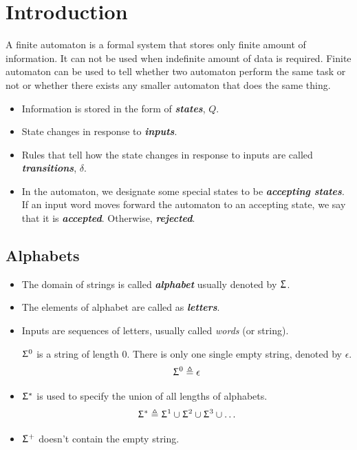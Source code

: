 \documentclass{report}
\begin{document}
\section{Introduction}
A finite automaton is a formal system that stores only finite amount of information. It can not be used when indefinite amount of data is required. Finite automaton can be used to tell whether two automaton perform the same task or not or whether there exists any smaller automaton that does the same thing. 
\begin{itemize}
    \item Information is stored in the form of \textit{\textbf{states}}, $Q$.
    \item State changes in response to \textit{\textbf{inputs}}.
    \item Rules that tell how the state changes in response to inputs are called \textit{\textbf{transitions}}, $\delta$. 
    \item In the automaton, we designate some special states to be \textit{\textbf{accepting states}}. If an input word moves forward the automaton to an accepting state, we say that it is \textit{\textbf{accepted}}. Otherwise, \textbf{\textit{rejected}}.
    \end{itemize}

    \subsection{Alphabets}
    \begin{itemize}
        \item The domain of strings is called \textit{\textbf{alphabet}} usually denoted by $\Upsigma$.
        \item The elements of alphabet are called as \textit{\textbf{letters}}.
        \item Inputs are sequences of letters, usually called \textit{words} (or string). \par
        $\Upsigma^0$ is a string of length 0. There is only one single empty string, denoted by $\epsilon$.
        $$\Upsigma^0 \triangleq {\epsilon}$$ 
        \item $\Upsigma^*$ is used to specify the union of all lengths of alphabets.
        $$\Upsigma^* \triangleq \Upsigma^1 \cup \Upsigma^2 \cup \Upsigma^3 \cup \ldots$$
        \item $\Upsigma^+$ doesn't contain the empty string.  
    \end{itemize}
\end{document}
